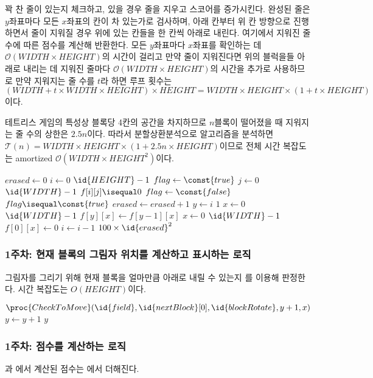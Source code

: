 꽉 찬 줄이 있는지 체크하고, 있을 경우 줄을 지우고 스코어를 증가시킨다. 완성된 줄은 $y$좌표마다 모든 $x$좌표의 칸이 차 있는가로 검사하며,
아래 칸부터 위 칸 방향으로 진행하면서 줄이 지워질 경우 위에 있는 칸들을 한 칸씩 아래로 내린다. 여기에서 지워진 줄 수에 따른 점수를 계산해 반환한다.
모든 $y$좌표마다 $x$좌표를 확인하는 데 $\mathcal{O}\left(WIDTH\times HEIGHT\right)$의 시간이 걸리고 만약 줄이 지워진다면
위의 블럭을들 아래로 내리는 데 지워진 줄마다 $\mathcal{O}\left(WIDTH\times HEIGHT\right)$의 시간을 추가로 사용하므로
만약 지워지는 줄 수를 $t$라 하면 루프 횟수는 $\left(WIDTH + t \times WIDTH\times HEIGHT\right)\times HEIGHT=
WIDTH\times HEIGHT\times\left(1 + t\times HEIGHT\right)$이다.

테트리스 게임의 특성상 블록당 4칸의 공간을 차지하므로 $n$블록이 떨어졌을 때 지워지는 줄 수의 상한은 $2.5n$이다. 따라서 분할상환분석으로 알고리즘을 분석하면
$\mathcal{T}\left(n\right)=WIDTH\times HEIGHT\times\left(1 + 2.5n \times HEIGHT\right)$이므로 전체 시간 복잡도는
amortized $\mathcal{O}\left(WIDTH\times HEIGHT^2\right)$이다.

\begin{codebox}
\li $erased \gets 0$
\li \For $i \gets 0$ \To $\id{HEIGHT} - 1$
\li \Do
        $flag \gets \const{true}$
\li     \For $j \gets 0$ \To $\id{WIDTH} - 1$
\li     \Do
            \If $f[i][j] \isequal 0$
\li         \Then
                $flag \gets \const{false}$
            \End
        \End
\li     \If $flag \isequal \const{true}$
            \Then
\li             $erased \gets erased + 1$
\li             \For $y \gets i$ \Downto $1$
\li             \Do
                    \For $x \gets 0$ \To $\id{WIDTH} - 1$
\li                 \Do
                        $f[y][x] \gets f[y - 1][x]$
                    \End
                \End
\li             \For $x \gets 0$ \To $\id{WIDTH} - 1$
\li             \Do
                    $f[0][x] \gets 0$
                \End
\li             $i \gets i - 1$
            \End
        \End
    \End
\li \Return $100 \times \id{erased}^2$
\end{codebox}

\subsubsection{1주차: 현재 블록의 그림자 위치를 계산하고 표시하는 로직} 그림자를 그리기 위해 현재 블록을 얼마만큼 아래로 내릴 수 있는지 를 이용해 판정한다.
시간 복잡도는 $O\left(HEIGHT\right)$이다.

\begin{codebox}
\li \While $\proc{CheckToMove}(\id{field}, \id{nextBlock}[0], \id{blockRotate}, y + 1, x)$
\li \Do
        $y \gets y + 1$
    \End
\li \Return $y$
\end{codebox}

\subsubsection{1주차: 점수를 계산하는 로직} 과 에서 계산된 점수는 에서 더해진다.